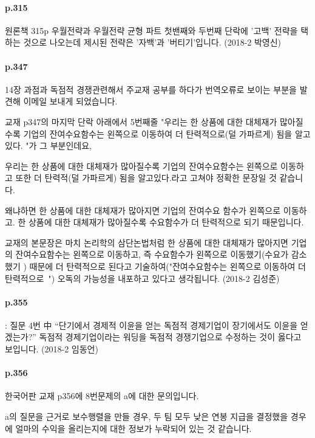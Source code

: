 \documentclass[a4paper]{article}
\begin{document}
\paragraph{p.315} %
\label{par:p_315}
원론책 315p 우월전략과 우월전략 균형 파트 첫밴째와 두번째 단락에 '고백' 전략을 택하는 것으로 나오는데 제시된 전략은 '자백'과 '버티기'입니다. (2018-2 박영신)
\paragraph{p.347} %
\label{par:p_347}
14장 과점과 독점적 경쟁관련해서 주교재 공부를 하다가 번역오류로 보이는 부분을 발견해 이메일 보내게 되었습니다. 

교재 p347의 마지막 단락 아래에서 5번째줄 "우리는 한 상품에 대한 대체재가 많아질수록 기업의 잔여수요함수는 왼쪽으로 이동하여 더 탄력적으로(덜 가파르게) 됨을 알고있다. "가 그 부분인데요,

우리는 한 상품에 대한 대체재가 많아질수록 기업의 잔여수요함수는 왼쪽으로 이동하고 또한 더 탄력적(덜 가파르게) 됨을 알고있다.라고 고쳐야 정확한 문장일 것 같습니다.

왜냐하면 한 상품에 대한 대체재가 많아지면 기업의 잔여수요 함수가 왼쪽으로 이동하고. 한 상품에 대한 대체재가 많아질수록 수요함수가 더 탄력적으로 되기 때문입니다.

교재의 본문장은 마치 논리학의 삼단논법처럼 한 상품에 대한 대체재가 많아지면 기업의 잔여수요함수는 왼쪽으로 이동하고, 즉 수요함수가 왼쪽으로 이동했기(수요가 감소했기 ) 때문에 더 탄력적으로 된다고 기술하여("잔여수요함수는 왼쪽으로 이동하여 더탄력적으로~")  오독의 가능성을 내포하고 있다고 생각됩니다. (2018-2 김성준)
\paragraph{p.355} %
\label{par:p_355}
: 질문 4번 中 “단기에서 경제적 이윤을 얻는 독점적 경제기업이 장기에서도 이윤을 얻겠는가?”
독점적 경제기업이라는 워딩을 독점적 경쟁기업으로 수정하는 것이 옳다고 보입니다. (2018-2 임동언)

\paragraph{p.356} %
\label{par:p_356}
한국어판 교재 p356에 8번문제의 a에 대한 문의입니다.
 
a의 질문을 근거로 보수행렬을 만들 경우, 두 팀 모두 낮은 연봉 지급을 결정했을 경우에 얼마의 수익을 올리는지에 대한 정보가 누락되어 있는 것 같습니다.
 
\end{document}
